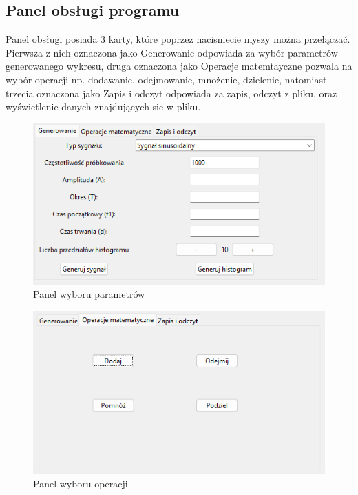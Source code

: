 \documentclass{article}
\begin{document}
\subsection{Panel obsługi programu}  


Panel obsługi posiada 3 karty, które poprzez nacisniecie myszy można przełączać.
Pierwsza z nich oznaczona jako Generowanie odpowiada za wybór parametrów generowanego
wykresu, druga oznaczona jako Operacje matemtayczne pozwala na wybór operacji np. dodawanie, odejmowanie, mnożenie,
dzielenie, natomiast trzecia oznaczona jako Zapis i odczyt odpowiada za zapis, odczyt z pliku,
oraz wyświetlenie danych znajdujących sie w pliku.
\FloatBarrier
\begin{figure}[h!]
    \centering
    \includegraphics[width=\textwidth]{img/generuj.png}
    \caption{Panel wyboru parametrów}
\end{figure}
\FloatBarrier
\begin{figure}[h!]
    \centering
    \includegraphics[width=\textwidth]{img/operacje.png}
    \caption{Panel wyboru operacji}
\end{figure}
\FloatBarrier
\end{document}
